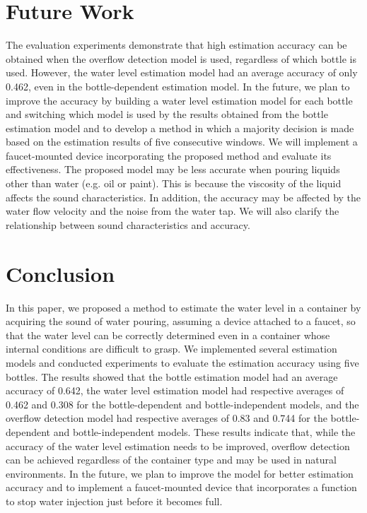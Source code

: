 \documentclass[sigconf]{acmart}
\begin{document}
\section{Future Work}
\label{sec:future_work}
The evaluation experiments demonstrate that high estimation accuracy can be obtained when the overflow detection model is used, regardless of which bottle is used. However, the water level estimation model had an average accuracy of only 0.462, even in the bottle-dependent estimation model. In the future, we plan to improve the accuracy by building a water level estimation model for each bottle and switching which model is used by the results obtained from the bottle estimation model and to develop a method in which a majority decision is made based on the estimation results of five consecutive windows. We will implement a faucet-mounted device incorporating the proposed method and evaluate its effectiveness. The proposed model may be less accurate when pouring liquids other than water (e.g. oil or paint). This is because the viscosity of the liquid affects the sound characteristics. In addition, the accuracy may be affected by the water flow velocity and the noise from the water tap. We will also clarify the relationship between sound characteristics and accuracy.



\section{Conclusion}
\label{sec:conclution}
In this paper, we proposed a method to estimate the water level in a container by acquiring the sound of water pouring, assuming a device attached to a faucet, so that the water level can be correctly determined even in a container whose internal conditions are difficult to grasp. We implemented several estimation models and conducted experiments to evaluate the estimation accuracy using five bottles. The results showed that the bottle estimation model had an average accuracy of 0.642, the water level estimation model had respective averages of 0.462 and 0.308 for the bottle-dependent and bottle-independent models, and the overflow detection model had respective averages of 0.83 and 0.744 for the bottle-dependent and bottle-independent models. These results indicate that, while the accuracy of the water level estimation needs to be improved, overflow detection can be achieved regardless of the container type and may be used in natural environments. In the future, we plan to improve the model for better estimation accuracy and to implement a faucet-mounted device that incorporates a function to stop water injection just before it becomes full.
\end{document}
